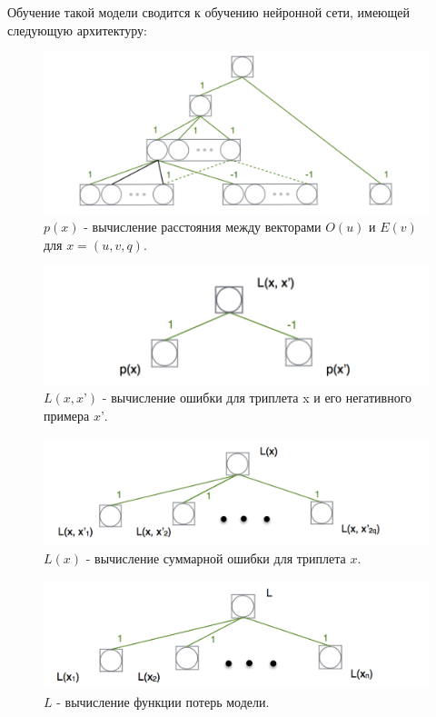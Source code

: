 Обучение такой модели сводится к обучению нейронной сети, имеющей
следующую архитектуру:

\begin{figure}[H]
\centering 
    \includegraphics[scale=0.6]{image/NN_part1_new.png}
    \caption{$p(x)$ - вычисление расстояния между векторами $O(u)$ и $E(v)$ для $x = (u, v, q)$.}
    \label{srg}
\end{figure}

\begin{figure}[H]
\centering 
    \includegraphics[scale=0.6]{image/NN_part2_new.png}
    \caption{$L(x, x’)$ - вычисление ошибки для триплета x и его негативного примера $x’$.}
    \label{srg}
\end{figure}

\begin{figure}[H]
\centering 
    \includegraphics[scale=0.6]{image/NN_part3_new.png}
    \caption{$L(x)$ - вычисление суммарной ошибки для триплета $x$.}
    \label{srg}
\end{figure}

\begin{figure}[H]
\centering 
    \includegraphics[scale=0.6]{image/NN_part4_new.png}
    \caption{$L$ - вычисление функции потерь модели.}
    \label{srg}
\end{figure}

